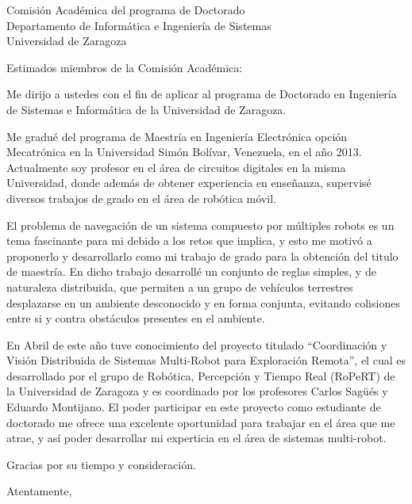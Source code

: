 \documentclass[10pt]{letter}
\begin{document}
\begin{letter}{Comisión Académica del programa de Doctorado\\
    Departamento de Informática e Ingeniería de Sistemas\\
    Universidad de Zaragoza}

\opening{Estimados miembros de la Comisión Académica:}

Me dirijo a ustedes con el fin de aplicar al programa de Doctorado en
Ingeniería de Sistemas e Informática de la Universidad de Zaragoza.

Me gradué del programa de Maestría en Ingeniería Electrónica opción
Mecatrónica en la Universidad Simón Bolívar, Venezuela, en el año 2013.
Actualmente soy profesor en el área de circuitos digitales en la misma
Universidad, donde además de obtener experiencia en enseñanza, supervisé
diversos trabajos de grado en el área de robótica móvil.

El problema de navegación de un sistema compuesto por múltiples robots es un
tema fascinante para mi debido a los retos que implica, y esto me motivó a
proponerlo y desarrollarlo como mi trabajo de grado para la obtención del titulo
de maestría. En dicho trabajo desarrollé un conjunto de reglas simples, y de
naturaleza distribuida, que permiten a un grupo de vehículos terrestres
desplazarse en un ambiente desconocido y en forma conjunta,
evitando colisiones entre si y contra obstáculos presentes en el ambiente.

En Abril de este año tuve conocimiento del proyecto titulado
``Coordinación y Visión Distribuida de Sistemas Multi-Robot para Exploración
Remota'', el cual es desarrollado por el grupo de Robótica, Percepción y Tiempo
Real (RoPeRT) de la Universidad de Zaragoza y es coordinado por los profesores
Carlos Sagüés y Eduardo Montijano. El poder participar en este proyecto como
estudiante de doctorado me ofrece una excelente oportunidad para trabajar en el
área que me atrae, y así poder desarrollar mi experticia en el área de sistemas
multi-robot.

Gracias por su tiempo y consideración.

\closing{Atentamente,}


\end{letter}
\end{document}
